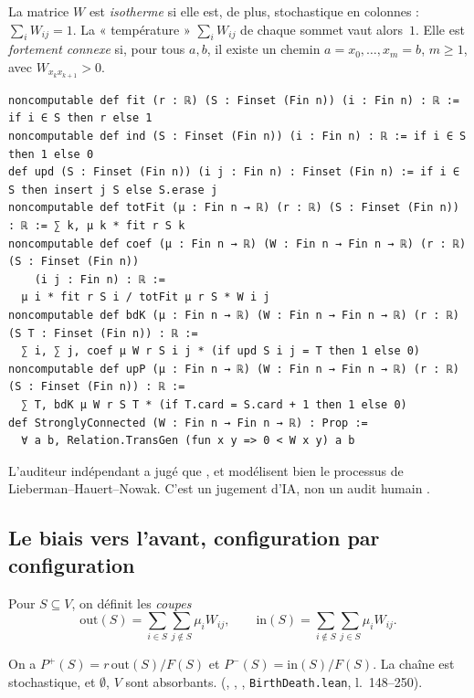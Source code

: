 \begin{definition}
La matrice $W$ est \emph{isotherme} si elle est, de plus, stochastique en colonnes : $\sum_iW_{ij}=1$. La
« température » $\sum_iW_{ij}$ de chaque sommet vaut alors~$1$. Elle est \emph{fortement connexe} si, pour tous
$a,b$, il existe un chemin $a=x_0,\dots,x_m=b$, $m\ge1$, avec $W_{x_kx_{k+1}}>0$.
\end{definition}

\begin{leanbox}
\begin{lstlisting}[language=Lean]
noncomputable def fit (r : ℝ) (S : Finset (Fin n)) (i : Fin n) : ℝ := if i ∈ S then r else 1
noncomputable def ind (S : Finset (Fin n)) (i : Fin n) : ℝ := if i ∈ S then 1 else 0
def upd (S : Finset (Fin n)) (i j : Fin n) : Finset (Fin n) := if i ∈ S then insert j S else S.erase j
noncomputable def totFit (μ : Fin n → ℝ) (r : ℝ) (S : Finset (Fin n)) : ℝ := ∑ k, μ k * fit r S k
noncomputable def coef (μ : Fin n → ℝ) (W : Fin n → Fin n → ℝ) (r : ℝ) (S : Finset (Fin n))
    (i j : Fin n) : ℝ :=
  μ i * fit r S i / totFit μ r S * W i j
noncomputable def bdK (μ : Fin n → ℝ) (W : Fin n → Fin n → ℝ) (r : ℝ) (S T : Finset (Fin n)) : ℝ :=
  ∑ i, ∑ j, coef μ W r S i j * (if upd S i j = T then 1 else 0)
noncomputable def upP (μ : Fin n → ℝ) (W : Fin n → Fin n → ℝ) (r : ℝ) (S : Finset (Fin n)) : ℝ :=
  ∑ T, bdK μ W r S T * (if T.card = S.card + 1 then 1 else 0)
def StronglyConnected (W : Fin n → Fin n → ℝ) : Prop :=
  ∀ a b, Relation.TransGen (fun x y => 0 < W x y) a b
\end{lstlisting}
L'auditeur indépendant a jugé que ,  et  modélisent bien le processus de
Lieberman--Hauert--Nowak. C'est un jugement d'IA, non un audit humain \tierC.
\end{leanbox}

\subsection{Le biais vers l'avant, configuration par configuration}
Pour $S\subseteq V$, on définit les \emph{coupes}
\[
\mathrm{out}(S)=\sum_{i\in S}\sum_{j\notin S}\mu_iW_{ij},\qquad \mathrm{in}(S)=\sum_{i\notin S}\sum_{j\in S}\mu_iW_{ij}.
\]

\begin{lemma}\label{ch4:lem:cuts}
On a $P^{+}(S)=r\,\mathrm{out}(S)/F(S)$ et $P^{-}(S)=\mathrm{in}(S)/F(S)$. La chaîne est stochastique, et
$\emptyset$, $V$ sont absorbants. \tierA{} (, , ,
\texttt{BirthDeath.lean}, l.~148--250).
\end{lemma}

